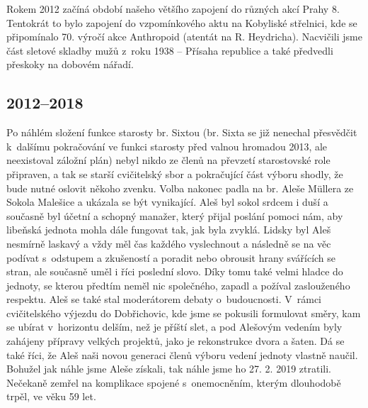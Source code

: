 \documentclass[a5paper, 11pt, twoside]{article}
\begin{document}
Rokem 2012 začíná období našeho většího zapojení do různých akcí Prahy
8. Tentokrát to bylo zapojení do vzpomínkového aktu na Kobyliské
střelnici, kde se připomínalo 70. výročí akce Anthropoid (atentát na R.
Heydricha). Nacvičili jsme část sletové skladby mužů z~roku 1938 --
Přísaha republice a také předvedli přeskoky na dobovém nářadí.

\clearpage

\subsection{2012--2018}

Po náhlém složení funkce starosty br. Sixtou (br. Sixta se již nenechal
přesvědčit k~dalšímu pokračování ve funkci starosty před valnou hromadou
2013, ale neexistoval záložní plán) nebyl nikdo ze členů na převzetí
starostovské role připraven, a tak se starší cvičitelský sbor a
pokračující část výboru shodly, že bude nutné oslovit někoho zvenku.
Volba nakonec padla na br. Aleše Müllera ze Sokola Malešice a ukázala se
být vynikající. Aleš byl sokol srdcem i duší a současně byl účetní a
schopný manažer, který přijal poslání pomoci nám, aby libeňská jednota
mohla dále fungovat tak, jak byla zvyklá. Lidsky byl Aleš nesmírně
laskavý a vždy měl čas každého vyslechnout a následně se na věc podívat
s~odstupem a zkušeností a poradit nebo obrousit hrany svářících se
stran, ale současně uměl i říci poslední slovo. Díky tomu také velmi
hladce do jednoty, se kterou předtím neměl nic společného, zapadl a
požíval zaslouženého respektu. Aleš se také stal moderátorem debaty
o~budoucnosti. V~rámci cvičitelského výjezdu do Dobřichovic, kde jsme se
pokusili formulovat směry, kam se ubírat v~horizontu delším, než je
příští slet, a pod Alešovým vedením byly zahájeny přípravy velkých
projektů, jako je rekonstrukce dvora a šaten. Dá se také říci, že Aleš
naši novou generaci členů výboru vedení jednoty vlastně naučil. Bohužel
jak náhle jsme Aleše získali, tak náhle jsme ho 27. 2. 2019 ztratili.
Nečekaně zemřel na komplikace spojené s~onemocněním, kterým dlouhodobě
trpěl, ve věku 59 let.
\end{document}
